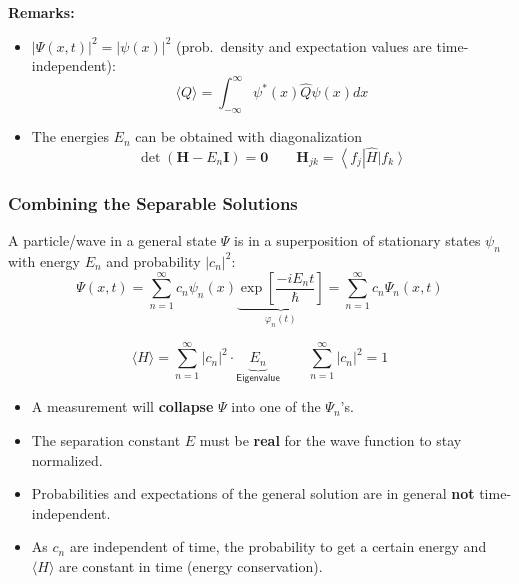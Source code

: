\newpar{}

\textbf{Remarks:}
\begin{itemize}
    \item $|\Psi(x,t)|^2 = |\psi(x)|^2$ (prob.\ density and expectation values are time-independent):
          \noindent\begin{equation*}
              \langle Q\rangle=\int_{-\infty}^\infty\psi^*(x)\widehat{Q}\psi(x)dx
          \end{equation*}
    \item The energies $E_n$ can be obtained with diagonalization
          \noindent\begin{equation*}
              \det\left(\mathbf{H}-E_n \mathbf{I}\right) = \mathbf{0} \qquad \mathbf{H}_{jk} = \left\langle f_j\right|\widehat{H}\left|f_k \right\rangle
          \end{equation*}
\end{itemize}

\subsubsection{Combining the Separable Solutions}
A particle/wave in a general state $\Psi$ is in a superposition of stationary states $\psi_n$ with energy $E_n$ and probability $|c_n|^2$:
\noindent\begin{equation*}
    \Psi(x,t) =\sum_{n=1}^\infty c_n\psi_n(x) \underbrace{\exp\left[\frac{-iE_n t}{\hbar}\right]}_{\varphi_n(t)}=\sum_{n=1}^\infty c_n\Psi_n(x,t)
\end{equation*}

\noindent\begin{equation*}
    \langle H\rangle=\sum_{n=1}^\infty|c_n|^2\cdot \underbrace{E_n}_{\textsf{Eigenvalue}} \qquad \sum_{n=1}^\infty|c_n|^2 =1
\end{equation*}

\begin{itemize}
    \item A measurement will \textbf{collapse} $\Psi$ into one of the $\Psi_n$'s.
    \item The separation constant $E$ must be \textbf{real} for the wave function to stay normalized.
    \item Probabilities and expectations of the general solution are in general \textbf{not} time-independent.
    \item As $c_n$ are independent of time, the probability to get a certain energy and $\langle H\rangle$ are constant in time (energy conservation).
\end{itemize}

